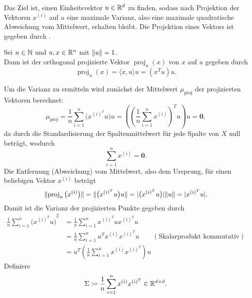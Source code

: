 Das Ziel ist, einen Einheitsvektor \(u \in \mathbb{R}^{d}\) zu finden, sodass nach Projektion der Vektoren \(x^{(i)}\) auf \(u\) eine maximale Varianz, also eine maximale quadratische Abweichung vom Mittelwert, erhalten bleibt.
Die Projektion eines Vektors ist gegeben durch .
\begin{repitition}\label{rep:proj}
    Sei \(n \in \mathbb{N}\) und \(u,x \in \mathbb{R}^{n}\) mit \(\lVert u\rVert = 1\).  \\
    Dann ist der orthogonal projizierte Vektor \(\operatorname{proj}_{u}(x)\) von \(x\) auf \(u\) gegeben durch
    \begin{equation*}
        \operatorname{proj}_{u}(x) = \langle x,u \rangle u = (x^{T}u)u.
    \end{equation*}     
\end{repitition}
Um die Varianz zu ermitteln wird zunächst der Mittelwert \(\mu_{\operatorname{proj}}\) der projizierten Vektoren berechnet:
\begin{equation*}
    \mu_{\operatorname{proj}} = \frac{1}{n}\sum_{i=1}^{n}\big(x^{{(i)}^{T}}u\big)u = \left({\left(\frac{1}{n}\sum_{i=1}^{n}x^{(i)}\right)}^{T}u\right)u = \symbf{0},
\end{equation*}
da durch die Standardisierung der Spaltenmittelwert für jede Spalte von \(X\) null beträgt, wodurch
\begin{equation*}
    \sum_{i=1}^{n}x^{(i)} = \symbf{0}.
\end{equation*}
Die Entfernung (Abweichung) vom Mittelwert, also dem Ursprung, für einen beliebigen Vektor \(x^{(i)}\) beträgt
\begin{equation*}
    \lVert\operatorname{proj}_{u}\big(x^{(i)}\big)\rVert = \lVert\big(x^{{(i)}^{T}}u\big)u\rVert =  \lvert\big(x^{{(i)}^{T}}u\big)\rvert\lVert u\rVert = \lvert x^{{(i)}^{T}}u\rvert.
\end{equation*}
Damit ist die Varianz der projizierten Punkte gegeben durch 
\begin{align*}
    \frac{1}{n}\sum_{i=1}^{n}{\big(x^{{(i)}^{T}}u\big)}^{2} &= \frac{1}{n}\sum_{i=1}^{n}x^{{(i)}^{T}}ux^{{(i)}^{T}}u \\
    &= \frac{1}{n}\sum_{i=1}^{n}u^{T}x^{(i)}x^{{(i)}^{T}}u \qquad (\text{Skalarprodukt kommutativ})\\
    &= u^{T}\left(\frac{1}{n}\sum_{i=1}^{n}x^{(i)}x^{{(i)}^{T}}\right)u
\end{align*}
Definiere 
\begin{equation*}
    \Sigma \coloneqq \frac{1}{n}\sum_{i=1}^{n}x^{(i)}x^{{(i)}^{T}} \in \mathbb{R}^{d \times d}.
\end{equation*}
